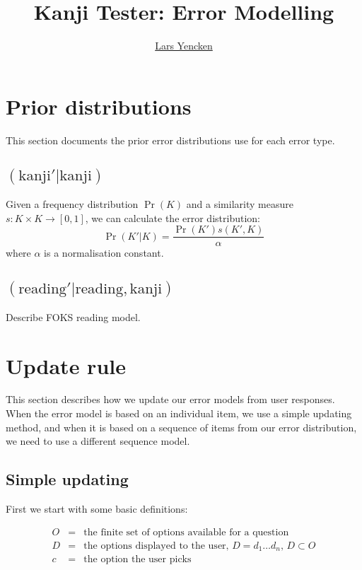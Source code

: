 \documentclass[11pt,a4paper]{article}
\title{\fontspec{ACaslonPro-Bold} Kanji Tester: Error Modelling}
\author{\href{mailto:lars@yencken.org}{Lars Yencken}}
\begin{document}
\maketitle

\tableofcontents

\section{Prior distributions}

This section documents the prior error distributions use for each error type. 

\subsection{$(\text{kanji}' | \text{kanji})$}

Given a frequency distribution $\Pr(K)$ and a similarity measure $s: K \times
K \rightarrow [0, 1]$, we can calculate the error distribution:
\[
\Pr(K'|K) = \frac{\Pr(K')s(K', K)}{\alpha}
\]
where $\alpha$ is a normalisation constant.

\subsection{$(\text{reading}' | \text{reading}, \text{kanji})$}

Describe FOKS reading model.

\section{Update rule}

This section describes how we update our error models from user responses.
When the error model is based on an individual item, we use a simple updating
method, and when it is based on a sequence of items from our error
distribution, we need to use a different sequence model.

\subsection{Simple updating}

First we start with some basic definitions:

\begin{eqnarray*}
O & = & \text{the finite set of options available for a question}\\
D & = & \text{the options displayed to the user, $D = d_1 \dots d_n$,
    $D \subset O$}\\
c & = & \text{the option the user picks}\\
\end{eqnarray*}
\end{document}
